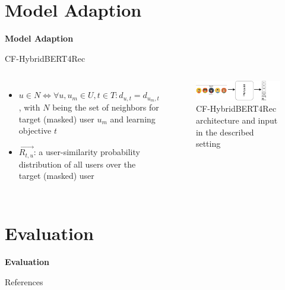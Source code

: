 \documentclass[en]{sdqbeamer}
\begin{document}
\section{Model Adaption}
\begin{frame}
	\centering\textbf{\LARGE{Model Adaption}}
\end{frame}

\begin{frame}{CF-HybridBERT4Rec}
	\begin{columns}
			\begin{itemize}
				\item $u \in N \iff \forall u, u_{m} \in U, t \in T: d_{u, t} = d_{u_{m}, t}$, with $N$ being the set of neighbors for target (masked) user $u_{m}$ and learning objective $t$
				\item $\overrightarrow{R_{t,u}}$: a user-similarity probability distribution of all users over the target (masked) user
			\end{itemize}
		\begin{figure}
			\includegraphics[width=\textwidth]{images/CF_use_case.pdf}
			\caption{CF-HybridBERT4Rec architecture and input in the described setting}
		\end{figure}
	\end{columns}
\end{frame}

\section{Evaluation}
\begin{frame}
	\centering\textbf{\LARGE{Evaluation}}
\end{frame}

\appendix
\beginbackup
\begin{frame}{References}
	\printbibliography
\end{frame}

\backupend
\end{document}
